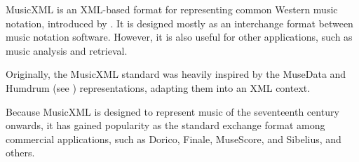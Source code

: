 


MusicXML is an XML-based format for representing common
Western music notation, introduced by
\textcite{good2001musicxml}. It is designed mostly as an
interchange format between music notation software. However,
it is also useful for other applications, such as music
analysis and retrieval.

Originally, the MusicXML standard was heavily inspired by
the MuseData and Humdrum (see
) representations, adapting
them into an XML context.



Because MusicXML is designed to represent music of the
seventeenth century onwards, it has gained popularity as the
standard exchange format among commercial applications, such
as Dorico,
Finale,
MuseScore, and
Sibelius, and
others.


